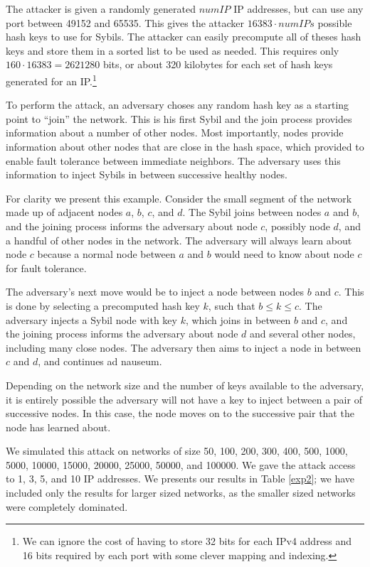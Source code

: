 \documentclass[a4paper]{article}
\begin{document}
The attacker is given a randomly generated $numIP$ IP addresses, but can use any port between 49152 and 65535.
This gives the attacker $ 16383 \cdot numIPs $ possible hash keys to use for Sybils.
The attacker can easily precompute all of theses hash keys and store them in a sorted list to be used as needed.
This requires only $160  \cdot 16383 = 2621280$  bits, or about 320 kilobytes for each set of hash keys generated for an IP.\footnote{We can ignore the cost of having to store 32 bits for each IPv4 address and 16 bits required by each port with some clever mapping and indexing.}

To perform the attack, an adversary choses any random hash key as a starting point to ``join'' the network.
This is his first Sybil and the join process provides information about a number of other nodes.
Most importantly,  nodes provide information about other nodes that are close in the hash space, which provided to enable fault tolerance between immediate neighbors.
The adversary uses this information to inject Sybils in between successive healthy nodes.


For clarity we present this example. 
Consider the small segment of the network made up of adjacent nodes $a$, $b$, $c$, and $d$.
The Sybil joins between nodes $a$ and $b$, and the joining process informs the adversary about node $c$, possibly node $d$, and a handful of other nodes in the network.
The adversary will always learn about node $c$ because a normal node between $a$ and $b$ would need to know about node $c$ for fault tolerance.

The adversary's next move would be to inject a node between nodes $b$ and $c$.
This is done by selecting a precomputed hash key $k$, such that $b \leq k \leq c$.
The adversary injects a Sybil node with key $k$, which joins in between $b$ and $c$, and the joining process informs the adversary about node $d$ and several other nodes, including many close nodes.
The adversary then aims to inject a node in between $c$ and $d$, and continues ad nauseum.

Depending on the network size and the number of keys available to the adversary, it is entirely possible the adversary will not have a key to inject between a pair of successive nodes.
In this case, the node moves on to the successive pair that the node has learned about.


We simulated this attack on networks of size 50, 100, 200, 300, 400, 500, 1000, 5000, 10000, 15000, 20000, 25000, 50000, and 100000.
We gave the attack access to 1, 3, 5, and 10 IP addresses.
We presents our results in Table \ref{exp2}; we have included only the results for larger sized networks, as the smaller sized networks were completely dominated.
\end{document}
